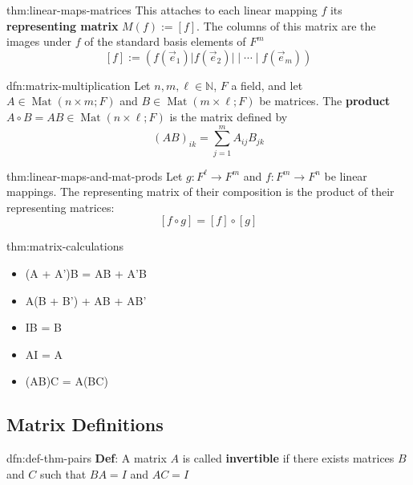 \documentclass[landscape, 8pt]{extarticle}
\DeclareMathOperator{\Mat}{Mat}
\begin{document}
\begin{multicols}{3}
\begin{thm}{thm:linear-maps-matrices}{}
    This attaches to each linear mapping $f$ its \textbf{representing matrix} $M(f) := [f]$. The columns of this matrix are the images under $f$ of the standard basis elements of $F^{m}$
    \[[f] := (f(\vec{e}_{1}) \lvert f(\vec{e}_{2}) \rvert \mid \cdots \mid f(\vec{e}_{m}))\]
\end{thm}


\begin{dfn}{dfn:matrix-multiplication}{}
    Let $n,m,\ell\in\mathbb{N}$, $F$ a field, and let $A\in \Mat(n \times m; F)$ and $B\in \Mat(m \times \ell; F)$ be matrices. The \textbf{product} $A \circ B = AB\in \Mat(n \times \ell;F)$ is the matrix defined by
    \[(AB)_{ik} = \sum_{j = 1}^{m} A_{ij}B_{jk}\]
\end{dfn}

\begin{thm}{thm:linear-maps-and-mat-prods}{}
    Let $g : F^{\ell}\to F^{m}$ and $f : F^{m} \to F^{n}$ be linear mappings. The representing matrix of their composition is the product of their representing matrices:
    \[[f \circ g] = [f] \circ [g]\]
    
\end{thm}


\begin{thm}{thm:matrix-calculations}{}
    \vspace{-10pt}
    \begin{multicols}{2}
    \begin{itemize}
        \item (A + A')B = AB + A'B
        \item A(B + B') + AB + AB'
        \item IB = B
        \item AI = A
        \item (AB)C = A(BC)
    \end{itemize}
    \end{multicols}
    \vspace{5pt}
\end{thm}

\newpage

\subsection{Matrix Definitions}

\begin{dfn}{dfn:def-thm-pairs}{}
    \textbf{Def}: A matrix $A$ is called \textbf{invertible} if there exists matrices $B$ and $C$ such that $BA = I$ and $AC = I$


\end{dfn}
\end{multicols}
\end{document}
